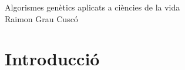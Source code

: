 \documentclass[titlepage,a4paper,12pt]{book}
\begin{document}
\begin{titlepage}
\begin{center}
{\Huge Algorismes genètics aplicats a ciències de la vida}\\[2cm]
{\Large  Raimon Grau Cuscó }\\[5cm]


\end{center}
\end{titlepage}

\newpage{\pagestyle{empty}\cleardoublepage}


\tableofcontents

\newpage{\pagestyle{empty}\cleardoublepage}

\chapter{Introducció}
%

%
%
%










\end{document}
